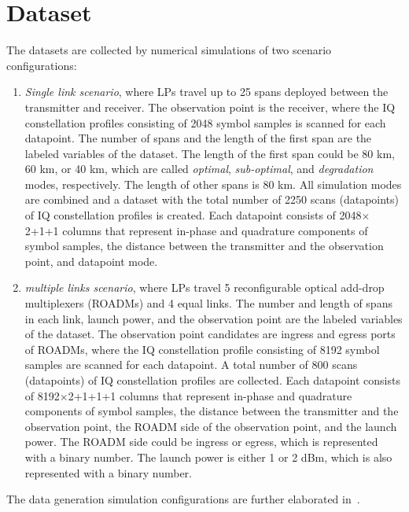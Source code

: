 \documentclass[lettersize,journal, one-column]{IEEEtran}
\begin{document}
\section{Dataset}
\label{section:dataset}
The datasets are collected by numerical simulations of two scenario configurations:
\begin{enumerate}
    \item \textit{Single link scenario}, where LPs travel up to 25 spans deployed between the transmitter and receiver.
    The observation point is the receiver, where the IQ constellation profiles consisting of 2048 symbol samples is scanned for each datapoint.
    The number of spans and the length of the first span are the labeled variables of the dataset.
    The length of the first span could be 80 km, 60 km, or 40 km, which are called \textit{optimal}, \textit{sub-optimal}, and \textit{degradation} modes, respectively.
    The length of other spans is 80 km.
    All simulation modes are combined and a dataset with the total number of 2250 scans (datapoints) of IQ constellation profiles is created. 
    Each datapoint consists of 2048$\times$2+1+1 columns that represent in-phase and quadrature components of symbol samples, the distance between the transmitter and the observation point, and datapoint mode.
    \item \textit{multiple links scenario}, where LPs travel 5 reconfigurable optical add-drop multiplexers (ROADMs) and 4 equal links.
    The number and length of spans in each link, launch power, and the observation point are the labeled variables of the dataset.
    The observation point candidates are ingress and egress ports of ROADMs, where the IQ constellation profile consisting of 8192 symbol samples are scanned for each datapoint.
    A total number of 800 scans (datapoints) of IQ constellation profiles are collected.
    Each datapoint consists of 8192$\times$2+1+1+1 columns that represent in-phase and quadrature components of symbol samples, the distance between the transmitter and the observation point, the ROADM side of the observation point, and the launch power.
    The ROADM side could be ingress or egress, which is represented with a binary number.
    The launch power is either 1 or 2 dBm, which is also represented with a binary number.
\end{enumerate}
The data generation simulation configurations are further elaborated in~\cite{data146_2022}.
\end{document}
